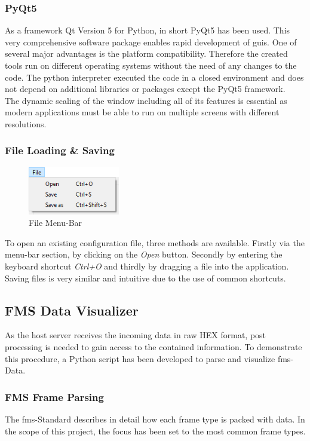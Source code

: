 \subsubsection{PyQt5}
As a framework Qt Version 5 for Python, in short PyQt5 has been used. This very comprehensive software package enables rapid development of \acrshort{gui}s. One of several major advantages is the platform compatibility. Therefore the created tools run on different operating systems without the need of any changes to the code. The python interpreter executed the code in a closed environment and does not depend on additional libraries or packages except the PyQt5 framework. \\
The dynamic scaling of the window including all of its features is essential as modern applications must be able to run on multiple screens with different resolutions.

\subsubsection{File Loading \& Saving}
\begin{figure}
\vspace{-0.6cm}
\includegraphics[width=4.0cm]{images/configuration-tool-file-panel}
\caption{File Menu-Bar}
\end{figure} 
To open an existing configuration file, three methods are available. Firstly via the menu-bar section, by clicking on the \textit{Open} button. Secondly by entering the keyboard shortcut \textit{Ctrl+O} and thirdly by dragging a file into the application. Saving files is very similar and intuitive due to the use of common shortcuts.

\subsection{FMS Data Visualizer}
As the host server receives the incoming data in raw HEX format, post processing is needed to gain access to the contained information. To demonstrate this procedure, a Python script has been developed to parse and visualize \acrshort{fms}-Data. 

\subsubsection{FMS Frame Parsing}
The \acrshort{fms}-Standard describes in detail how each frame type is packed with data. In the scope of this project, the focus has been set to the most common frame types.

